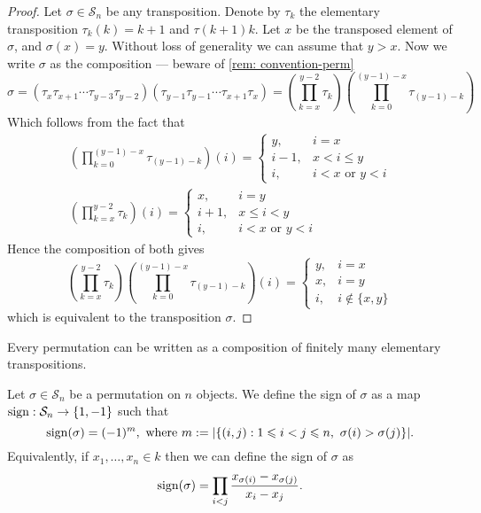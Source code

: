 \begin{proof}
  Let \(\sigma \in \mathcal S_n\) be any transposition. Denote by \(\tau_k\) the
  elementary transposition \(\tau_k(k) = k + 1\) and \(\tau(k + 1) k\). Let
  \(x\) be the transposed element of \(\sigma\), and \(\sigma(x) = y\). Without
  loss of generality we can assume that \(y > x\). Now we write \(\sigma\) as
  the composition --- beware of \cref{rem: convention-perm}
  \[
    \sigma = \left(\tau_x \tau_{x + 1} \cdots \tau_{y - 3} \tau_{y - 2} \right)
    \left( \tau_{y - 1} \tau_{y - 1} \cdots \tau_{x + 1} \tau_{x} \right)
    = \left( \prod_{k = x}^{y-2} \tau_k \right)
    \left( \prod_{k = 0}^{(y - 1) - x} \tau_{(y-1) - k} \right)
  \]
  Which follows from the fact that
  \begin{gather*}
    \left( \prod_{k = 0}^{(y - 1) - x} \tau_{(y-1) - k} \right)(i) =
    \begin{cases}
      y, &i = x \\
      i - 1, &x < i \leq y \\
      i, &i < x \text{ or } y < i
    \end{cases}
    \\
    \left( \prod_{k = x}^{y-2} \tau_k \right)(i) =
    \begin{cases}
      x, &i = y \\
      i + 1, &x \leq i < y \\
      i, &i < x \text{ or } y < i
    \end{cases}
  \end{gather*}
  Hence the composition of both gives
  \[
    \left( \prod_{k = x}^{y-2} \tau_k \right)
    \left( \prod_{k = 0}^{(y - 1) - x} \tau_{(y-1) - k} \right)(i) =
    \begin{cases}
      y, &i = x \\
      x, &i = y \\
      i, &i \not\in \{x, y\}
    \end{cases}
  \]
  which is equivalent to the transposition \(\sigma\).
\end{proof}

\begin{corollary}
  Every permutation can be written as a composition of finitely many elementary
  transpositions.
\end{corollary}

\begin{definition}[Sign]
  \label{def: sign}
  Let \(\sigma \in \mathcal S_n\) be a permutation on \(n\) objects. We define
  the sign of \(\sigma\) as a map \(\operatorname{sign}: \mathcal S_n \to
  \{1, -1\}\) such that
  \[
    \operatorname{sign}(\sigma) = (-1)^m, \text{ where }
    m := |\{(i, j) : 1 \leqslant i < j \leqslant n,\ \sigma(i) > \sigma(j)\}|.
  \]
  Equivalently, if \(x_1, \dots, x_n \in k\) then we can define the
  sign of \(\sigma\) as
  \[
    \operatorname{sign}(\sigma) = \prod_{i < j} \frac{x_{\sigma(i)} -
    x_{\sigma(j)}}{x_i - x_j}.
  \]
\end{definition}


